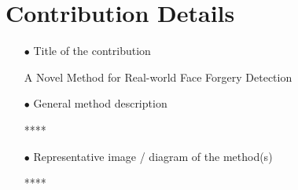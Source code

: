 \documentclass[runningheads]{llncs}
\begin{document}
\section{Contribution Details}
\begin{spacing}{1.5}
\begin{itemize}

\item[$\bullet$] Title of the contribution

A Novel Method for Real-world Face Forgery Detection

\item[$\bullet$] General method description

****

\item[$\bullet$] Representative image / diagram of the method(s)

****

\end{itemize}
\end{spacing}
\end{document}
